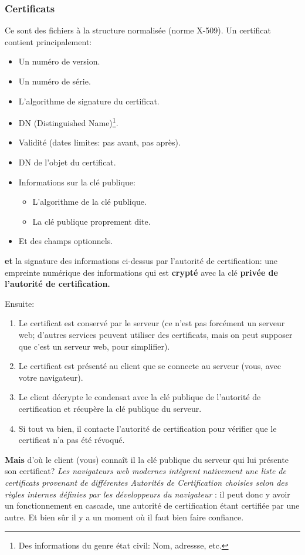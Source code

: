 \subsubsection{Certificats} Ce sont des fichiers à la structure
normalisée (norme X-509). Un certificat
contient principalement:
\begin{itemize}
\item Un numéro de version.
\item Un numéro de série.
\item L'algorithme de signature du certificat.
\item DN (Distinguished Name)\footnote{Des informations du genre \og
  état civil\fg{}: Nom, adressse, etc.}.
\item Validité (dates limites:  pas avant,  pas après).
\item DN de l'objet du certificat.
\item Informations sur la clé publique:
  \begin{itemize}
  \item     L'algorithme de la clé publique.
  \item     La clé publique proprement dite.
  \end{itemize}
\item Et des champs optionnels.
\end{itemize}

\textbf{et} la signature des informations ci-dessus par l'autorité de
certification: une empreinte numérique  des informations qui est
\textbf{crypté} avec la clé \textbf{privée de l'autorité de certification.}

Ensuite:

\begin{enumerate}
  \item Le certificat est conservé par le serveur (ce n'est pas
  forcément un serveur web; d'autres services peuvent utiliser des
  certificats, mais on peut supposer que c'est un serveur web, pour
  simplifier). 
  \item Le certificat est présenté au client que se connecte au
    serveur (vous, avec votre navigateur).
  \item Le client décrypte le condensat avec la clé publique de
    l'autorité de certification et récupère la clé publique du serveur.
  \item Si tout va bien, il contacte l'autorité de certification pour
    vérifier que le certificat n'a pas été révoqué.
\end{enumerate}
 \textbf{Mais} d'où le client (vous) connaît il la clé publique du
 serveur qui lui présente son certificat? \og \emph{Les navigateurs web
 modernes intègrent nativement une liste de certificats provenant de
 différentes Autorités de Certification choisies selon des règles
 internes définies par les développeurs du navigateur} \fg{}: il peut
 donc y avoir un fonctionnement en cascade, une autorité de
 certification étant certifiée par une autre. Et bien sûr il y a un
 moment où il faut bien faire confiance.


